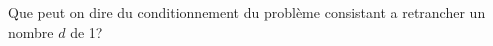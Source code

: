 
\begin{exercice}\label{exoSerieUn0006}

Que peut on dire du conditionnement du problème consistant a retrancher un nombre  $d$ de 1?

\end{exercice}
